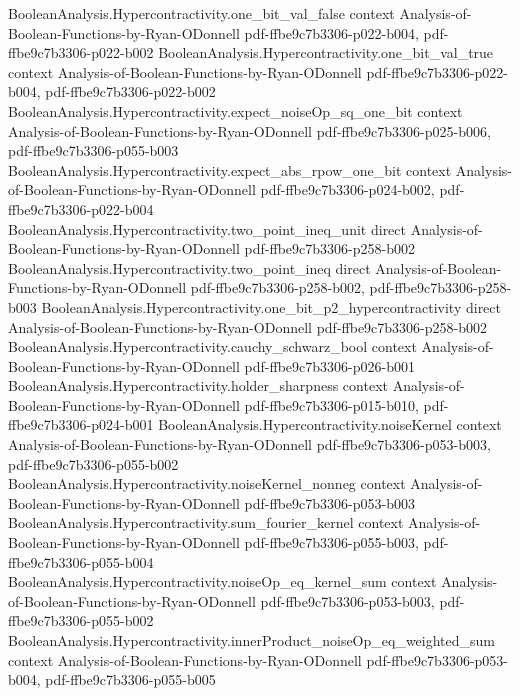 \begin{theorem}
\proofstep
  {BooleanAnalysis.Hypercontractivity.one_bit_val_false}
  {context}
  {Analysis-of-Boolean-Functions-by-Ryan-ODonnell}
  {pdf-ffbe9c7b3306-p022-b004,
    pdf-ffbe9c7b3306-p022-b002}
\proofstep
  {BooleanAnalysis.Hypercontractivity.one_bit_val_true}
  {context}
  {Analysis-of-Boolean-Functions-by-Ryan-ODonnell}
  {pdf-ffbe9c7b3306-p022-b004,
    pdf-ffbe9c7b3306-p022-b002}
\proofstep
  {BooleanAnalysis.Hypercontractivity.expect_noiseOp_sq_one_bit}
  {context}
  {Analysis-of-Boolean-Functions-by-Ryan-ODonnell}
  {pdf-ffbe9c7b3306-p025-b006,
    pdf-ffbe9c7b3306-p055-b003}
\proofstep
  {BooleanAnalysis.Hypercontractivity.expect_abs_rpow_one_bit}
  {context}
  {Analysis-of-Boolean-Functions-by-Ryan-ODonnell}
  {pdf-ffbe9c7b3306-p024-b002,
    pdf-ffbe9c7b3306-p022-b004}
\proofstep
  {BooleanAnalysis.Hypercontractivity.two_point_ineq_unit}
  {direct}
  {Analysis-of-Boolean-Functions-by-Ryan-ODonnell}
  {pdf-ffbe9c7b3306-p258-b002}
\proofstep
  {BooleanAnalysis.Hypercontractivity.two_point_ineq}
  {direct}
  {Analysis-of-Boolean-Functions-by-Ryan-ODonnell}
  {pdf-ffbe9c7b3306-p258-b002,
    pdf-ffbe9c7b3306-p258-b003}
\proofstep
  {BooleanAnalysis.Hypercontractivity.one_bit_p2_hypercontractivity}
  {direct}
  {Analysis-of-Boolean-Functions-by-Ryan-ODonnell}
  {pdf-ffbe9c7b3306-p258-b002}
\proofstep
  {BooleanAnalysis.Hypercontractivity.cauchy_schwarz_bool}
  {context}
  {Analysis-of-Boolean-Functions-by-Ryan-ODonnell}
  {pdf-ffbe9c7b3306-p026-b001}
\proofstep
  {BooleanAnalysis.Hypercontractivity.holder_sharpness}
  {context}
  {Analysis-of-Boolean-Functions-by-Ryan-ODonnell}
  {pdf-ffbe9c7b3306-p015-b010,
    pdf-ffbe9c7b3306-p024-b001}
\proofstep
  {BooleanAnalysis.Hypercontractivity.noiseKernel}
  {context}
  {Analysis-of-Boolean-Functions-by-Ryan-ODonnell}
  {pdf-ffbe9c7b3306-p053-b003,
    pdf-ffbe9c7b3306-p055-b002}
\proofstep
  {BooleanAnalysis.Hypercontractivity.noiseKernel_nonneg}
  {context}
  {Analysis-of-Boolean-Functions-by-Ryan-ODonnell}
  {pdf-ffbe9c7b3306-p053-b003}
\proofstep
  {BooleanAnalysis.Hypercontractivity.sum_fourier_kernel}
  {context}
  {Analysis-of-Boolean-Functions-by-Ryan-ODonnell}
  {pdf-ffbe9c7b3306-p055-b003,
    pdf-ffbe9c7b3306-p055-b004}
\proofstep
  {BooleanAnalysis.Hypercontractivity.noiseOp_eq_kernel_sum}
  {context}
  {Analysis-of-Boolean-Functions-by-Ryan-ODonnell}
  {pdf-ffbe9c7b3306-p053-b003,
    pdf-ffbe9c7b3306-p055-b002}
\proofstep
  {BooleanAnalysis.Hypercontractivity.innerProduct_noiseOp_eq_weighted_sum}
  {context}
  {Analysis-of-Boolean-Functions-by-Ryan-ODonnell}
  {pdf-ffbe9c7b3306-p053-b004,
    pdf-ffbe9c7b3306-p055-b005}

\end{theorem}
